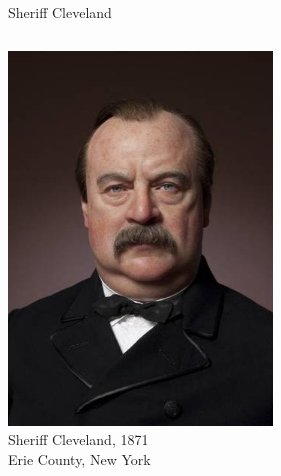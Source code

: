 \begin{frame}{Sheriff Cleveland}
    \begin{columns}[onlytextwidth]
            \centering
            \includegraphics[width=0.75\textwidth]{img/cleveland.png} \\

            \centering
            Sheriff Cleveland, 1871 \\
            Erie County, New York
    \end{columns}
\end{frame}

